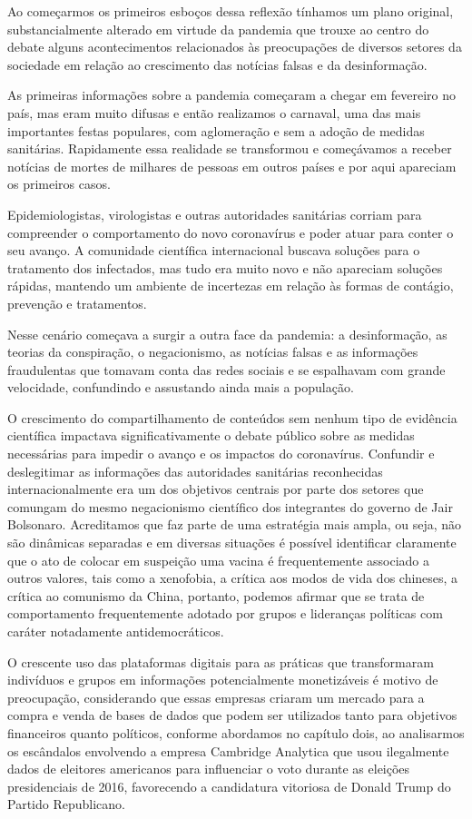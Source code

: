 Ao começarmos os primeiros esboços dessa reflexão tínhamos um plano
original, substancialmente alterado em virtude da pandemia que trouxe ao
centro do debate alguns acontecimentos relacionados às preocupações de
diversos setores da sociedade em relação ao crescimento das notícias
falsas e da desinformação.

As primeiras informações sobre a pandemia começaram a chegar em
fevereiro no país, mas eram muito difusas e então realizamos o carnaval,
uma das mais importantes festas populares, com aglomeração e sem a
adoção de medidas sanitárias. Rapidamente essa realidade se transformou
e começávamos a receber notícias de mortes de milhares de pessoas em
outros países e por aqui apareciam os primeiros casos.

Epidemiologistas, virologistas e outras autoridades sanitárias corriam
para compreender o comportamento do novo coronavírus e poder atuar para
conter o seu avanço. A comunidade científica internacional buscava
soluções para o tratamento dos infectados, mas tudo era muito novo e não
apareciam soluções rápidas, mantendo um ambiente de incertezas em
relação às formas de contágio, prevenção e tratamentos.

Nesse cenário começava a surgir a outra face da pandemia: a
desinformação, as teorias da conspiração, o negacionismo, as notícias
falsas e as informações fraudulentas que tomavam conta das redes sociais
e se espalhavam com grande velocidade, confundindo e assustando ainda
mais a população.

O crescimento do compartilhamento de conteúdos sem nenhum tipo de
evidência científica impactava significativamente o debate público sobre
as medidas necessárias para impedir o avanço e os impactos do
coronavírus. Confundir e deslegitimar as informações das autoridades
sanitárias reconhecidas internacionalmente era um dos objetivos centrais
por parte dos setores que comungam do mesmo negacionismo científico dos
integrantes do governo de Jair Bolsonaro. Acreditamos que faz parte de
uma estratégia mais ampla, ou seja, não são dinâmicas separadas e em
diversas situações é possível identificar claramente que o ato de
colocar em suspeição uma vacina é frequentemente associado a outros
valores, tais como a xenofobia, a crítica aos modos de vida dos
chineses, a crítica ao comunismo da China, portanto, podemos afirmar que
se trata de comportamento frequentemente adotado por grupos e lideranças
políticas com caráter notadamente antidemocráticos.

O crescente uso das plataformas digitais para as práticas que
transformaram indivíduos e grupos em informações potencialmente
monetizáveis é motivo de preocupação, considerando que essas empresas
criaram um mercado para a compra e venda de bases de dados que podem ser
utilizados tanto para objetivos financeiros quanto políticos, conforme
abordamos no capítulo dois, ao analisarmos os escândalos envolvendo a
empresa Cambridge Analytica que usou ilegalmente dados de eleitores
americanos para influenciar o voto durante as eleições presidenciais de
2016, favorecendo a candidatura vitoriosa de Donald Trump do Partido
Republicano.

